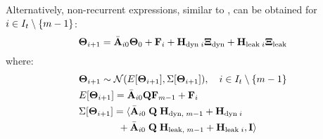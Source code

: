 Alternatively, non-recurrent expressions, similar to , can be obtained for $i \in I_t \setminus \{m - 1\}$:
\[
\mathbf{\Theta}_{i + 1} = \Bar{\mathbf{A}}_{i0} \mathbf{\Theta}_0 + \mathbf{F}_i + \mathbf{H}_{\text{dyn} \; i} \mathbf{\Xi}_{\text{dyn}} + \mathbf{H}_{\text{leak} \; i} \mathbf{\Xi}_{\text{leak}}
\]
where:
\begin{align*}
  & \mathbf{\Theta}_{i + 1} \sim \mathcal{N}(E[\mathbf{\Theta}_{i + 1}], \Sigma[\mathbf{\Theta}_{i + 1}]), \hspace{10pt} i \in I_t \setminus \{m - 1\} \\
  & E[\mathbf{\Theta}_{i + 1}] = \Bar{\mathbf{A}}_{i0} \mathbf{Q} \mathbf{F}_{m - 1} + \mathbf{F}_i \\
  & \Sigma[\mathbf{\Theta}_{i + 1}] = \langle \Bar{\mathbf{A}}_{i0} \; \mathbf{Q} \; \mathbf{H}_{\text{dyn}, \; m - 1} + \mathbf{H}_{\text{dyn} \; i} \\
  & { } \qquad \qquad + \Bar{\mathbf{A}}_{i0} \; \mathbf{Q} \; \mathbf{H}_{\text{leak}, \; m - 1} + \mathbf{H}_{\text{leak} \; i}, \mathbf{I} \rangle
\end{align*}
